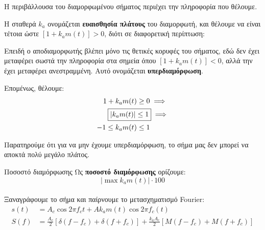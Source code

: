 \documentclass[11pt,a4paper,notitlepage,fleqn]{article}
\begin{document}
Η περιβάλλουσα του διαμορφωμένου σήματος περιέχει την πληροφορία που θέλουμε.

Η σταθερά \( k_a \) ονομάζεται \textbf{ευαισθησία πλάτους} του διαμορφωτή, και θέλουμε
να είναι τέτοια ώστε \( \left[1 + k_a m(t)\right] > 0 \), διότι σε διαφορετική περίπτωση:


Επειδή ο αποδιαμορφωτής βλέπει μόνο τις θετικές κορυφές του σήματος, εδώ δεν έχει μεταφέρει
σωστά την πληροφορία στα σημεία όπου \(  \left[1 + k_a m(t)\right] < 0  \), αλλά την έχει
μεταφέρει ανεστραμμένη. Αυτό ονομάζεται \textbf{υπερδιαμόρφωση}.

Επομένως, θέλουμε:
\begin{align*}
	1+ k_a m(t) &\geq 0 \implies \\
	\Aboxed{\left\lvert k_a m(t) \right\rvert &\leq 1} \implies \\
	-1 \leq k_a m(t) &\leq 1
\end{align*}

Παρατηρούμε ότι για να μην έχουμε υπερδιαμόρφωση, το σήμα μας δεν μπορεί να αποκτά πολύ
μεγάλο πλάτος.

\begin{defn}{Ποσοστό διαμόρφωσης}{}
	Ως \textbf{ποσοστό διαμόρφωσης} ορίζουμε:
	\[
	\left\lvert
	\max k_a m(t)
	\right\rvert \cdot 100
	\]
\end{defn}

\paragraph{}
Ξαναγράφουμε το σήμα και παίρνουμε το μετασχηματισμό Fourier:
\begin{align*}
	s(t) &= A_c \cos 2\pi f_c t + Ak_a m(t) \cos 2\pi f_c (t) \\
	S(f) &=
	\frac{A_c}{2}\left[ δ(f-f_c)+δ(f+f_c) \right]
	+ \frac{k_aA_c}{2}\left[ M(f-f_c) + M(f+f_c) \right]
\end{align*}
\end{document}
